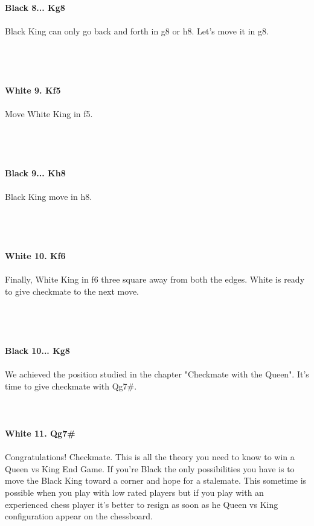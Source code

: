 \documentclass{article}
\begin{document}
\\
\textbf{Black 8... Kg8}\\
\\
Black King can only go back and forth in g8 or h8. Let's move it in g8.\\\\
\\

\\
\\
\textbf{White 9. Kf5}\\
\\
Move White King in f5.\\\\
\\

\\
\\
\textbf{Black 9... Kh8}\\
\\
Black King move in h8.\\\\
\\

\\
\\
\textbf{White 10. Kf6}\\
\\
Finally, White King in f6 three square away from both the edges. White is ready to give checkmate to the next move.\\\\
\\

\\
\\
\textbf{Black 10... Kg8}\\
\\
We achieved the position studied in the chapter "Checkmate with the Queen". It's time to give checkmate with Qg7\#.\\
\\

\\
\\
\textbf{White 11. Qg7\#}\\
\\
Congratulations! Checkmate. This is all the theory you need to know to win a Queen vs King End Game. If you're Black the only possibilities you have is to move the Black King toward a corner and hope for a stalemate. This sometime is possible when you play with low rated players but if you play with an experienced chess player it's better to resign as soon as he Queen vs King configuration appear on the chessboard.
\end{document}
